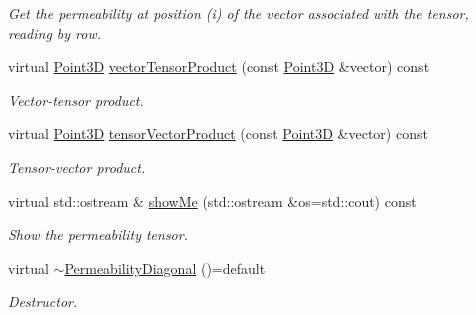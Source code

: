 \begin{DoxyCompactItemize}
\begin{DoxyCompactList}\small\item\em Get the permeability at position (i) of the vector associated with the tensor, reading by row. \end{DoxyCompactList}\item 
virtual \hyperlink{classFVCode3D_1_1Point3D}{Point3D} \hyperlink{classFVCode3D_1_1PermeabilityDiagonal_a281067ac8a3ea3058ae886f036eadb01}{vector\+Tensor\+Product} (const \hyperlink{classFVCode3D_1_1Point3D}{Point3D} \&vector) const 
\begin{DoxyCompactList}\small\item\em Vector-\/tensor product. \end{DoxyCompactList}\item 
virtual \hyperlink{classFVCode3D_1_1Point3D}{Point3D} \hyperlink{classFVCode3D_1_1PermeabilityDiagonal_ab73038761c1d6c3de0c7b7d5395af2cd}{tensor\+Vector\+Product} (const \hyperlink{classFVCode3D_1_1Point3D}{Point3D} \&vector) const 
\begin{DoxyCompactList}\small\item\em Tensor-\/vector product. \end{DoxyCompactList}\item 
virtual std\+::ostream \& \hyperlink{classFVCode3D_1_1PermeabilityDiagonal_a5f0d1d524dfb3240601a5fed2272ff42}{show\+Me} (std\+::ostream \&os=std\+::cout) const 
\begin{DoxyCompactList}\small\item\em Show the permeability tensor. \end{DoxyCompactList}\item 
virtual \hyperlink{classFVCode3D_1_1PermeabilityDiagonal_ac8f88adb901080b1cce5cd60c4c62059}{$\sim$\+Permeability\+Diagonal} ()=default
\begin{DoxyCompactList}\small\item\em Destructor. \end{DoxyCompactList}\end{DoxyCompactItemize}
